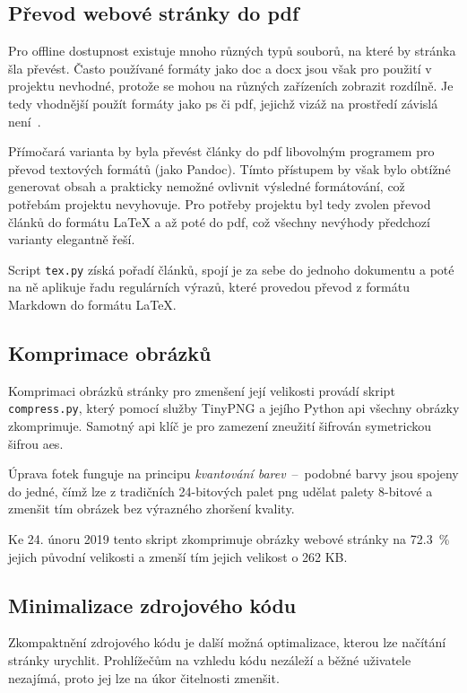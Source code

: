 \documentclass[a4paper, 12pt, twoside]{article}
\begin{document}
  \subsection{Převod webové stránky do \acrshort{pdf}} \label{sec:Převod webové stránky do PDF}
  Pro offline dostupnost existuje mnoho různých typů souborů, na které by stránka šla převést. Často používané formáty jako \gls{doc} a \gls{docx} jsou však pro použití v projektu nevhodné, protože se mohou na různých zařízeních zobrazit rozdílně. Je tedy vhodnější použít formáty jako \gls{ps} či \gls{pdf}, jejichž vizáž na prostředí závislá není~\cite{history-of-pdf}.

  Přímočará varianta by byla převést články do \gls{pdf} libovolným programem pro převod textových formátů (jako Pandoc). Tímto přístupem by však bylo obtížné generovat obsah a prakticky nemožné ovlivnit výsledné formátování, což potřebám projektu nevyhovuje. Pro potřeby projektu byl tedy zvolen převod článků do formátu \LaTeX{} a až poté do \gls{pdf}, což všechny nevýhody předchozí varianty elegantně řeší.

  Script \texttt{tex.py} získá pořadí článků, spojí je za sebe do jednoho dokumentu a poté na ně aplikuje řadu regulárních výrazů, které provedou převod z formátu Markdown do formátu \LaTeX.


  \subsection{Komprimace obrázků}
  Komprimaci obrázků stránky pro zmenšení její velikosti provádí skript \texttt{compress.py}, který pomocí služby TinyPNG a jejího Python \gls{api} všechny obrázky zkomprimuje. Samotný \gls{api} klíč je pro zamezení zneužití šifrován symetrickou šifrou \gls{aes}.

  Úprava fotek funguje na principu \emph{kvantování barev}~--~podobné barvy jsou spojeny do jedné, čímž lze z tradičních 24-bitových palet \gls{png} udělat palety 8-bitové a zmenšit tím obrázek bez výrazného zhoršení kvality.

  Ke 24. únoru 2019 tento skript zkomprimuje obrázky webové stránky na \SI{72.3}{\percent} jejich původní velikosti a zmenší tím jejich velikost o \num{262} KB.


  \subsection{Minimalizace zdrojového kódu}
  Zkompaktnění zdrojového kódu je další možná optimalizace, kterou lze načítání stránky urychlit. Prohlížečům na vzhledu kódu nezáleží a běžné uživatele nezajímá, proto jej lze na úkor čitelnosti zmenšit.
\end{document}
